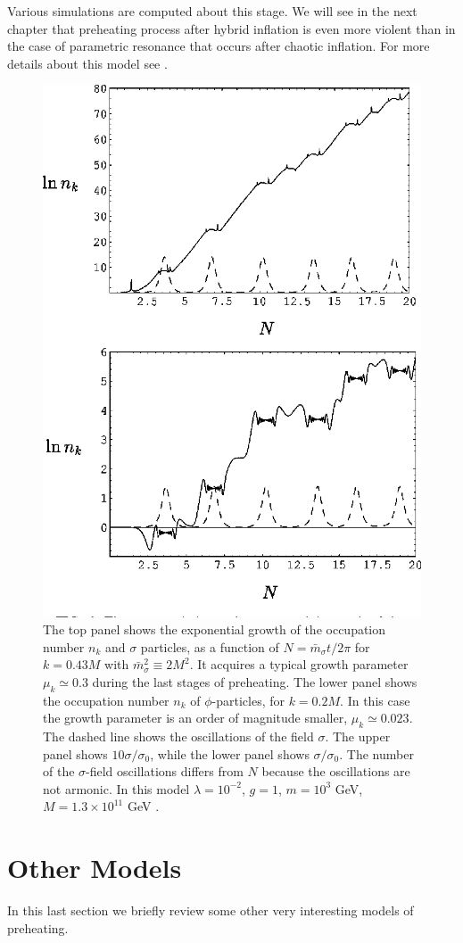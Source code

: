 \documentclass[11pt,a4paper,twoside]{book}
\begin{document}
Various simulations  are computed about this stage. We will see in the next chapter that preheating process after hybrid inflation is even more violent  than in the case of parametric resonance that occurs after chaotic inflation. For more details about this model see \cite{Chap4:TachyonicPreheating}.
\begin{figure}
	\centering
	\includegraphics[width=0.6\linewidth, height=0.45\textheight]{Images/Chap4/TachyonicModel}
	\caption{The top panel shows the exponential growth of the occupation number $ n_{k} $ and $\sigma$ particles, as a function of $ N=\bar{m}_{\sigma}t/ 2 \pi $ for $ k=0.43M $ with $ \bar{m}_{\sigma}^{2} \equiv 2M^{2} $. It acquires a typical growth parameter $\mu_{k} \simeq 0.3$ during the last stages of preheating. The lower panel shows the occupation number $ n_{k} $ of $\phi$-particles, for $ k=0.2M $. In this case the growth parameter is an order of magnitude smaller, $\mu_{k} \simeq 0.023$. The dashed line shows the oscillations of the field $\sigma$. The upper panel shows $ 10\sigma/\sigma_{0} $, while the lower panel shows $ \sigma/\sigma_{0}. $ The number of the $\sigma$-field oscillations differs from $ N $ because the oscillations are not armonic. In this model $ \lambda = 10^{-2} $, $ g=1 $, $ m=10^{3} $ GeV, $ M=1.3 \times 10^{11} $ GeV \cite{Chap4:TachyonicPreheating}.}
	\label{fig:tachyonicmodel}
\end{figure}

\section{Other Models}
In this last section we briefly review some other very interesting models of preheating.
\end{document}
